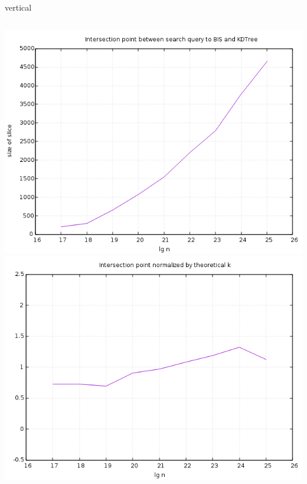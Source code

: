 \documentclass[pdf]{beamer}
\begin{document}
\begin{frame}{vertical}
  \begin{columns}
    \includegraphics[scale=0.35]{pictures/analysis/vert.png}
    \includegraphics[scale=0.35]{pictures/analysis/vert_theory.png}
  \end{columns}
\end{frame}
\end{document}
